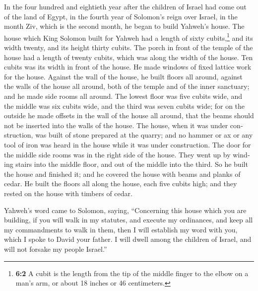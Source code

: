 \begin{paracol}{2}
\begin{otherlanguage}{english}
 In the four hundred and eightieth year after the children
of Israel had come out of the land of Egypt, in the fourth year of
Solomon's reign over Israel, in the month Ziv, which is the second
month, he began to build Yahweh's house.  The house which
King Solomon built for Yahweh had a length of sixty cubits,\footnote{\textbf{6:2}
  A cubit is the length from the tip of the middle finger to the elbow
  on a man's arm, or about 18 inches or 46 centimeters.} and its width
twenty, and its height thirty cubits.  The porch in front
of the temple of the house had a length of twenty cubits, which was
along the width of the house. Ten cubits was its width in front of the
house.  He made windows of fixed lattice work for the
house.  Against the wall of the house, he built floors all
around, against the walls of the house all around, both of the temple
and of the inner sanctuary; and he made side rooms all around.
 The lowest floor was five cubits wide, and the middle was
six cubits wide, and the third was seven cubits wide; for on the outside
he made offsets in the wall of the house all around, that the beams
should not be inserted into the walls of the house.  The
house, when it was under construction, was built of stone prepared at
the quarry; and no hammer or ax or any tool of iron was heard in the
house while it was under construction.  The door for the
middle side rooms was in the right side of the house. They went up by
winding stairs into the middle floor, and out of the middle into the
third.  So he built the house and finished it; and he
covered the house with beams and planks of cedar.  He
built the floors all along the house, each five cubits high; and they
rested on the house with timbers of cedar.

 Yahweh's word came to Solomon, saying, 
``Concerning this house which you are building, if you will walk in my
statutes, and execute my ordinances, and keep all my commandments to
walk in them, then I will establish my word with you, which I spoke to
David your father.  I will dwell among the children of
Israel, and will not forsake my people Israel.''


\end{otherlanguage}
\end{paracol}
